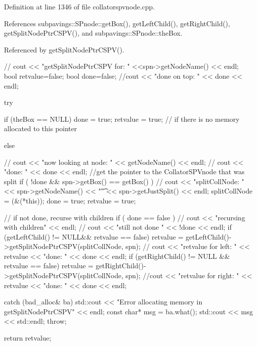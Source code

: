 \-Definition at line 1346 of file collatorspvnode.\-cpp.



\-References subpavings\-::\-S\-Pnode\-::get\-Box(), get\-Left\-Child(), get\-Right\-Child(), get\-Split\-Node\-Ptr\-C\-S\-P\-V(), and subpavings\-::\-S\-Pnode\-::the\-Box.



\-Referenced by get\-Split\-Node\-Ptr\-C\-S\-P\-V().


\begin{DoxyCode}
    {
  //  cout << "getSplitNodePtrCSPV for: " <<spn->getNodeName() << endl;
    bool retvalue=false;
    bool done=false;
    //cout << "done on top: " << done << endl;
        
    try {
      
           if (theBox == NULL) { done = true;
           retvalue = true; } // if there is no memory allocated to this
       pointer
          
           else {
    //         cout << "now looking at node: " << getNodeName() << endl;
        //    cout << "done: " << done << endl;     
          //get the pointer to the CollatorSPVnode that was split
          if ( !done && spn->getBox() == getBox() ){ 
      //      cout << "splitCollNode: " << spn->getNodeName() << "\t" <<
       spn->getJustSplit() << endl;
            splitCollNode = (&(*this));
            done = true; 
            retvalue = true;
          }
             
          // if not done, recurse with children
          if ( done == false ) { 
        //    cout << "recursing with children" << endl;  
          //  cout << "still not done " << !done << endl;
            if (getLeftChild() != NULL&& retvalue == false) {
            retvalue = getLeftChild()->getSplitNodePtrCSPV(splitCollNode,                                 
      spn);
          //  cout << "retvalue for left: " << retvalue << "done: " << done <<
       endl;
            }
            if (getRightChild() != NULL && retvalue == false) {
            retvalue = getRightChild()->getSplitNodePtrCSPV(splitCollNode,                              
      spn);
            //cout << "retvalue for right: " << retvalue << "done: " << done <<
       endl;
            } 
          }
        }
      }
        catch (bad_alloc& ba) {
            std::cout << "Error allocating memory in getSplitNodePtrCSPV" << 
      endl;
            const char* msg = ba.what();
            std::cout << msg << std::endl;
            throw;
        }
        
        return retvalue;
    }
\end{DoxyCode}
